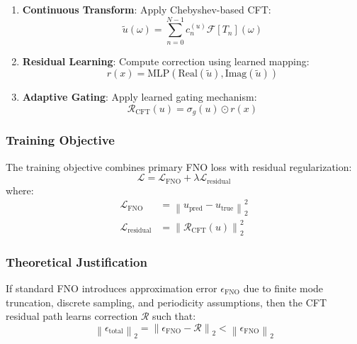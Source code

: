 \documentclass[11pt,twocolumn]{article}
\newcommand{\norm}[1]{\left\|#1\right\|}
\newcommand{\F}{\mathcal{F}}
\begin{document}
\begin{enumerate}
    \item \textbf{Continuous Transform}: Apply Chebyshev-based CFT:
    \begin{equation}
    \tilde{u}(\omega) = \sum_{n=0}^{N-1} c_n^{(u)} \F[T_n](\omega)
    \end{equation}
    
    \item \textbf{Residual Learning}: Compute correction using learned mapping:
    \begin{equation}
    r(x) = \text{MLP}\left(\text{Real}(\tilde{u}), \text{Imag}(\tilde{u})\right)
    \end{equation}
    
    \item \textbf{Adaptive Gating}: Apply learned gating mechanism:
    \begin{equation}
    \mathcal{R}_{\text{CFT}}(u) = \sigma_g(u) \odot r(x)
    \end{equation}
\end{enumerate}

\subsubsection{Training Objective}

The training objective combines primary FNO loss with residual regularization:
\begin{equation}
\mathcal{L} = \mathcal{L}_{\text{FNO}} + \lambda \mathcal{L}_{\text{residual}}
\end{equation}
where:
\begin{align}
\mathcal{L}_{\text{FNO}} &= \norm{u_{\text{pred}} - u_{\text{true}}}_2^2 \\
\mathcal{L}_{\text{residual}} &= \norm{\mathcal{R}_{\text{CFT}}(u)}_2^2
\end{align}

\subsubsection{Theoretical Justification}

If standard FNO introduces approximation error $\epsilon_{\text{FNO}}$ due to finite mode truncation, discrete sampling, and periodicity assumptions, then the CFT residual path learns correction $\mathcal{R}$ such that:
\begin{equation}
\norm{\epsilon_{\text{total}}}_2 = \norm{\epsilon_{\text{FNO}} - \mathcal{R}}_2 < \norm{\epsilon_{\text{FNO}}}_2
\end{equation}
\end{document}
